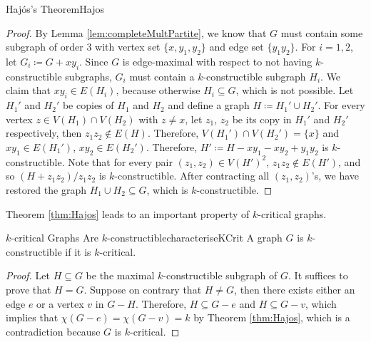 \documentclass[math]{amznotes}
\theoremstyle{remark}
\newcommand{\0}{\mathbf{0}}
\newcommand{\1}{\mathbf{1}}
\begin{document}
\begin{thmbox}{Haj\'{o}s's Theorem}{Hajos}
\begin{proof}
        By Lemma \ref{lem:completeMultPartite}, we know that $G$ must contain some subgraph of order $3$ with vertex set $\{x, y_1, y_2\}$ and edge set $\{y_1y_2\}$. For $i = 1, 2$, let $G_i \coloneqq G + xy_i$. Since $G$ is edge-maximal with respect to not having $k$-constructible subgraphs, $G_i$ must contain a $k$-constructible subgraph $H_i$. We claim that $xy_i \in E(H_i)$, because otherwise $H_i \subseteq G$, which is not possible. Let $H_1'$ and $H_2'$ be copies of $H_1$ and $H_2$ and define a graph $H \coloneqq H_1' \cup H_2'$. For every vertex $z \in V(H_1) \cap V(H_2)$ with $z \neq x$, let $z_1$, $z_2$ be its copy in $H_1'$ and $H_2'$ respectively, then $z_1z_2 \notin E(H)$. Therefore, $V(H_1') \cap V(H_2') = \{x\}$ and $xy_1 \in E(H_1')$, $xy_2 \in E(H_2')$. Therefore, $H' \coloneqq H - xy_1 - xy_2 + y_1y_2$ is $k$-constructible. Note that for every pair $(z_1, z_2) \in V(H')^2$, $z_1z_2 \notin E(H')$, and so $(H + z_1z_2)/z_1z_2$ is $k$-constructible. After contracting all $(z_1, z_2)$'s, we have restored the graph $H_1 \cup H_2 \subseteq G$, which is $k$-constructible.
    \end{proof}
\end{thmbox}
Theorem \ref{thm:Hajos} leads to an important property of $k$-critical graphs.
\begin{corbox}{$k$-critical Graphs Are $k$-constructible}{characteriseKCrit}
    A graph $G$ is $k$-constructible if it is $k$-critical. 
    \tcblower
    \begin{proof}
        Let $H \subseteq G$ be the maximal $k$-constructible subgraph of $G$. It suffices to prove that $H = G$. Suppose on contrary that $H \neq G$, then there exists either an edge $e$ or a vertex $v$ in $G - H$. Therefore, $H \subseteq G - e$ and $H \subseteq G - v$, which implies that $\chi(G - e) = \chi(G - v) = k$ by Theorem \ref{thm:Hajos}, which is a contradiction because $G$ is $k$-critical.
    \end{proof}
\end{corbox}
\end{document}
